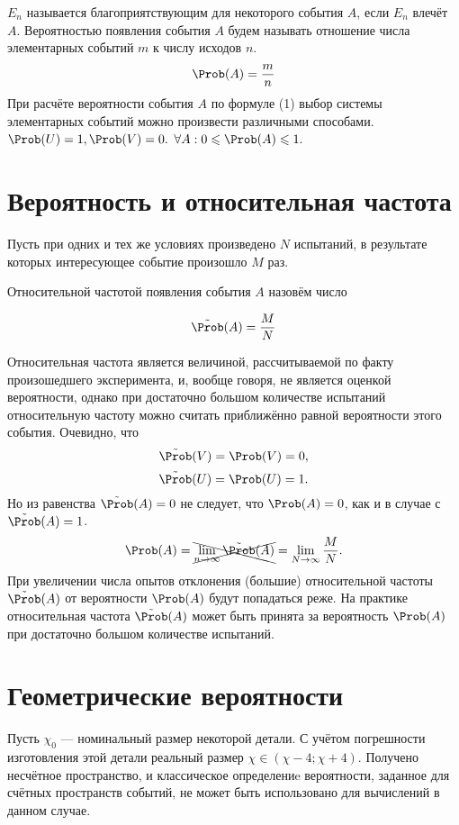  $E_n$ называется благоприятствующим для некоторого события $A$, если $E_n$ влечёт $A$.
 Вероятностью появления события $A$ будем называть отношение числа элементарных событий $m$ к числу исходов $n$.
\begin{equation}
	\Prob (A) = \frac{m}{n} \hfill
\end{equation}
\addition При расчёте вероятности события $A$ по формуле (1) выбор системы элементарных событий можно произвести различными способами.
\conclusion $\Prob(U) = 1, \Prob(V) = 0.$
\conclusion $\forall A: 0 \leqslant \Prob(A) \leqslant 1.$
\section{Вероятность и относительная частота}
\begin{definition}
	Пусть при одних и тех же условиях произведено $N$ испытаний, в результате которых интересующее событие произошло $M$ раз.
\end{definition}

Относительной частотой появления события $A$ назовём число

\begin{equation}
	\tilde{\Prob}(A) = \frac{M}{N}
\end{equation}

Относительная частота является величиной, рассчитываемой по факту произошедшего эксперимента, и, вообще говоря, не является оценкой вероятности, однако при достаточно большом количестве испытаний относительную частоту можно считать приближённо равной вероятности этого события.
Очевидно, что
$$\tilde{\Prob}(V) = \Prob(V) = 0,$$
$$\tilde{\Prob}(U) = \Prob(U) = 1.$$
Но из равенства $\tilde{\Prob}(A) = 0$ не следует, что $\Prob(A) = 0$, как и в случае с  $\tilde{\Prob}(A) = 1$.
\[
	\Prob(A) = \xcancel {\lim_{n\to\infty} \tilde{\Prob}(A)} = \lim_{N\to\infty} \frac{M}{N}.
\]
При увеличении числа опытов отклонения (большие) относительной частоты $\tilde{\Prob}(A)$ от вероятности $\Prob(A)$ будут попадаться реже. На практике относительная частота $\tilde{\Prob}(A)$ может быть принята за вероятность $\Prob(A)$ при достаточно большом количестве испытаний.

\section{Геометрические вероятности}
Пусть $\chi_0$ --- номинальный размер некоторой детали. С учётом погрешности изготовления этой детали реальный размер $\chi \in (\chi - 4; \chi + 4)$. Получено несчётное пространство, и классическое определениe вероятности, заданное для счётных пространств событий, не может быть использовано для вычислений в данном случае.

